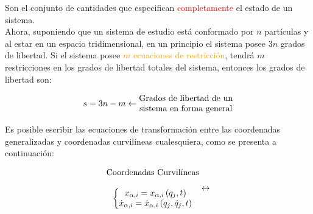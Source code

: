 \documentclass[/home/hernan/Documentos/Apuntes_mecanica_teorica/main.tex]{subfiles}
\begin{document}
    \begin{definition}
        Son el conjunto de cantidades  que especifican \textcolor{red}{completamente} el estado de un sistema. \\

        Ahora, suponiendo que un sistema de estudio está conformado por $n$ partículas y al estar en un espacio tridimensional, en un principio el sistema posee $3n$ grados de libertad. Si el sistema posee \textcolor{orange}{$m$ ecuaciones  de restricción}, tendrá $m$ restricciones en los grados de libertad totales del sistema, entonces los grados de libertad son:

        \begin{equation*}
            s = 3n -m \leftarrow     \begin{matrix} \textup{Grados de libertad de un} \\ \textup{sistema en forma general}\end{matrix}       
        \end{equation*}

        Es posible escribir las ecuaciones de transformación entre las coordenadas generalizadas y coordenadas curvilíneas cualesquiera, como se presenta a continuación:

        \begin{equation*}
            \begin{matrix}
                \begin{matrix}
                \textup{Coordenadas Curvilíneas}  \\ 
                    \\ 
                    \left\{\begin{matrix}
                            x_{\alpha,i} = x_{\alpha,i}\left ( q_{j},t \right ) \\ 
                            \dot{x}_{\alpha,i} = \dot{x}_{\alpha,i} \left (  q_{j}, \dot{q}_{j},t \right ) \\ 
                            \end{matrix}\right .
                \end{matrix} 
                
                \leftrightarrow 
                

\end{matrix}
\end{equation*}
\end{definition}
\end{document}
